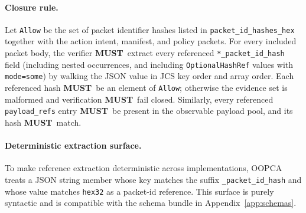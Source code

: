 \documentclass[11pt]{article}
\newcommand{\MUST}{\textbf{MUST}}
\begin{document}
\paragraph{Closure rule.} 
Let \texttt{Allow} be the set of packet identifier hashes listed in \texttt{packet\_id\_hashes\_hex} together with the action intent, manifest, and policy packets.
For every included packet body, the verifier \MUST\ extract every referenced \texttt{*\_packet\_id\_hash} field (including nested occurrences, and including \texttt{OptionalHashRef} values with \texttt{mode=some}) by walking the JSON value in JCS key order and array order.
Each referenced hash \MUST\ be an element of \texttt{Allow}; otherwise the evidence set is malformed and verification \MUST\ fail closed.
Similarly, every referenced \texttt{payload\_refs} entry \MUST\ be present in the observable payload pool, and its hash \MUST\ match.

\paragraph{Deterministic extraction surface.} 
To make reference extraction deterministic across implementations, OOPCA treats a JSON string member whose key matches the suffix \texttt{\_packet\_id\_hash} and whose value matches \texttt{hex32} as a packet-id reference.
This surface is purely syntactic and is compatible with the schema bundle in Appendix~\ref{app:schemas}.
\end{document}
